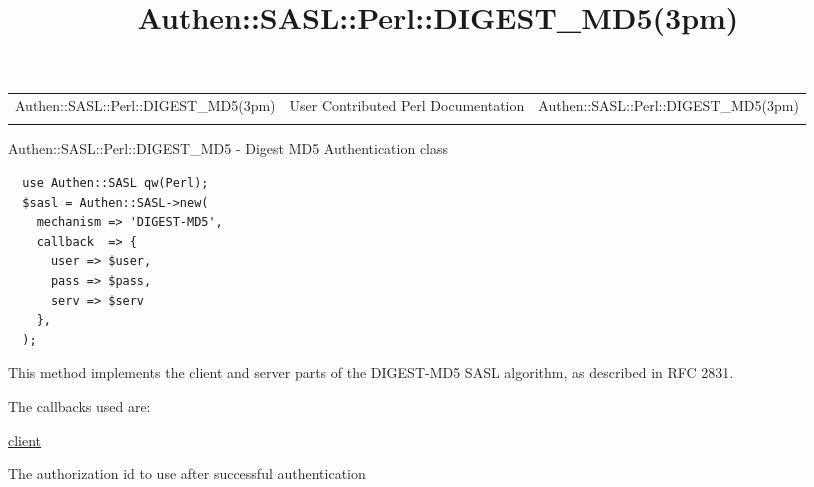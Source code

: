 \documentclass[]{article}
\title{Authen::SASL::Perl::DIGEST\_MD5(3pm)}
\author{}
\date{}
\renewcommand{\emph}[1]{\underline{#1}}
\begin{document}
\maketitle

\begin{longtable}[c]{@{}lll@{}}
\toprule\addlinespace
Authen::SASL::Perl::DIGEST\_MD5(3pm) & User Contributed Perl
Documentation & Authen::SASL::Perl::DIGEST\_MD5(3pm)
\\\addlinespace
\bottomrule
\end{longtable}


Authen::SASL::Perl::DIGEST\_MD5 - Digest MD5 Authentication class


\begin{verbatim}
  use Authen::SASL qw(Perl);
  $sasl = Authen::SASL->new(
    mechanism => 'DIGEST-MD5',
    callback  => {
      user => $user, 
      pass => $pass,
      serv => $serv
    },
  );
\end{verbatim}


This method implements the client and server parts of the DIGEST-MD5
SASL algorithm, as described in RFC 2831.


The callbacks used are:

\emph{client}

\begin{description}
\itemsep1pt\parskip0pt
\item[authname]
The authorization id to use after successful authentication
\end{description}
\end{document}
